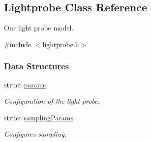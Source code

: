 \hypertarget{classLightprobe}{\subsection{\-Lightprobe \-Class \-Reference}
\label{classLightprobe}
}


\-Our light probe model.  




{\ttfamily \#include $<$lightprobe.\-h$>$}

\subsubsection*{\-Data \-Structures}
\begin{DoxyCompactItemize}
\item 
struct \hyperlink{structLightprobe_1_1params}{params}
\begin{DoxyCompactList}\small\item\em \-Configuration of the light probe. \end{DoxyCompactList}\item 
struct \hyperlink{structLightprobe_1_1samplingParams}{sampling\-Params}
\begin{DoxyCompactList}\small\item\em \-Configures sampling. \end{DoxyCompactList}\end{DoxyCompactItemize}
